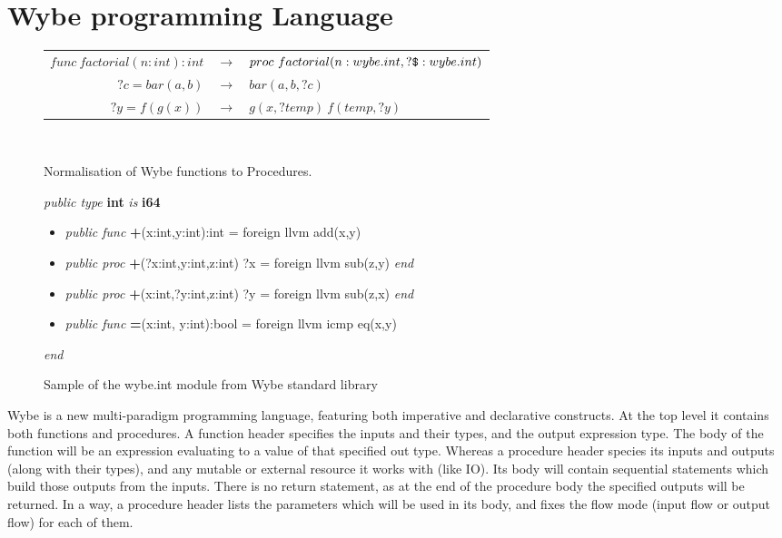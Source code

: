 \chapter{Wybe programming Language}


\begin{figure}
\centering
\begin{tabular}{r c l}

\( func\ factorial(n:int):int \) & \(\rightarrow \) & 
\( proc\ factorial(n:wybe.int, ?\verb+$+:wybe.int) \) \\
\( ?c = bar(a, b) \) & \(\rightarrow\) & \( bar(a, b, ?c) \) \\
\( ?y = f(g(x)) \) & \(\rightarrow\) & \( g(x, ?temp)\ f(temp, ?y) \) \\


\end{tabular}
\\
\caption{Normalisation of Wybe functions to Procedures.}
\label{fig:wybe_convert_to_proc}
\end{figure}


\begin{figure}


\textit{public type} \textbf{int} \textit{is} \textbf{i64} \\

\begin{itemize}[label={}]

\item
\textit{public func} 
\textbf{+}(x:int,y:int):int = foreign llvm add(x,y)

\item  
\textit{public proc} 
\textbf{+}(?x:int,y:int,z:int) ?x = foreign llvm sub(z,y) 
\textit{end}

\item 
\textit{public proc} 
\textbf{+}(x:int,?y:int,z:int) ?y = foreign llvm sub(z,x) 
\textit{end}

\item 
\textit{public func} 
\textbf{=}(x:int, y:int):bool = foreign llvm icmp eq(x,y)
\end{itemize}

\textit{end} \\

\caption{Sample of the wybe.int module from Wybe standard library}
\label{fig:wybe_int}
\end{figure}


Wybe is a new multi-paradigm programming language, featuring both imperative
and declarative constructs. At the top level it contains both functions and
procedures. A function header specifies the inputs and their types, and the
output expression type. The body of the function will be an expression
evaluating to a value of that specified out type. Whereas a procedure header
species its inputs and outputs (along with their types), and any mutable or
external resource it works with (like IO). Its body will contain sequential
statements which build those outputs from the inputs. There is no return
statement, as at the end of the procedure body the specified outputs will be
returned. In a way, a procedure header lists the parameters which will be used
in its body, and fixes the flow mode (input flow or output flow) for each of
them.

